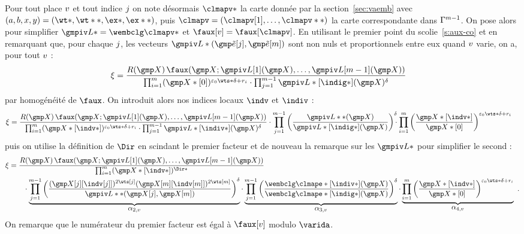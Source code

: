 Pour tout place \( v \) et tout indice \( j \) on note désormais
\( \clmapv* \) la carte donnée par la section~\vref{sec:vaemb} avec \( (a, b,
  x, y) = (\wt*, \wt**, \ex*, \ex**) \), puis \( \clmapv = (\clmapv[1], \dots,
  \clmapv**) \) la carte correspondante dans \( \Gamma^{m-1} \).  On
pose alors pour simplifier \( \wembclv* = \wembclg\clmapv* \) et \( \fauxv =
  \faux[\clmapv] \).  En utilisant le premier point du scolie~\vref{s:aux-co}
et en remarquant que, pour chaque \( j \), les vecteurs \( \wembclv*
  (\cexa[\fcti], \cexa[\puiss]) \) sont non nuls et proportionnels entre eux
quand \( v \) varie, on a, pour tout \( v \) :
\begin{align}
  \ratf
  & =
  \frac{
    R(\vmp) \,
    \faux( \vmp; \wembclv[1](\vmp), \dots, \wembclv[\puiss-1](\vmp) )
  }{
    \prod\fctrange
    (\vmp*[0])^{\epsz \wts* \delta + r_\fct}
    \cdot
    \prod\fctirange
    \wembclv*[\indig*](\vmp) ^{ \delta }
  }
\end{align}
par homogénéité de \( \faux \). On introduit alors nos indices locaux \( \indv
\) et \( \indiv \) :
\begin{align}
  \ratf
   & =
  \frac{
    R(\vmp) \,
    \faux( \vmp; \wembclv[1](\vmp), \dots, \wembclv[\puiss-1](\vmp) )
  }{
    \prod\fctrange
    (\vmp*[\indv*])^{\epsz \wts* \delta + r_\fct}
    \cdot
    \prod\fctirange
    \wembclv*[\indiv*](\vmp) ^{ \delta }
  }
  \cdot \prod\fctirange
  \left(
    \frac{ \wembclv**(\vmp) }{ \wembclv*[\indig*](\vmp) }
  \right) ^{ \delta }
  \!\!\! \cdot \prod\fctrange
  \left(
    \frac{ \vmp*[\indv*] }{ \vmp*[0] }
  \right) ^{ \epsz \wts* \delta + r_\fct }
\end{align}
puis on utilise la définition de \( \Dir \) en scindant le premier facteur et
de nouveau la remarque sur les \( \wembclv* \) pour simplifier le second :
\begin{align}
  \ratf
  & =
  \frac{
    R(\vmp) \,
    \faux( \vmp; \wembclv[1](\vmp), \dots, \wembclv[\puiss-1](\vmp) )
  }{
    \prod\fctrange (\vmp*[\indv*]) ^{ \Dir* }
  }
  \\ & \qquad
  \cdot \underbrace{
    \prod\fctirange \left(
      \frac{
        ( \vmp[\fcti ][{\indv[\fcti ]}] )^{ 2\wts[\fcti ] }
        ( \vmp[\puiss][{\indv[\puiss]}] )^{ 2\wts[\puiss] }
      }{
        \wembclv**(\vmp[\fcti], \vmp[\puiss])
      }
    \right)^\delta
  }_{\textstyle \ratfv2}
  \cdot \underbrace{
    \prod\fctirange \left(
      \frac{
        \wembclg\clmape*[\indiv*](\vmp) }{
        \wembclg\clmape*[\indig*](\vmp) }
    \right) ^{ \delta }
  }_{\textstyle \ratfv3}
  \cdot \underbrace{
    \prod\fctrange \left(
      \frac{ \vmp*[\indv*] }{ \vmp*[0] }
    \right) ^{ \epsz \wts* \delta + r_\fct }
  }_{\textstyle \ratfv4}
  \pmm.
\end{align}
On remarque que le numérateur du premier facteur est égal à \( \fauxv \)
modulo \( \varida \).

